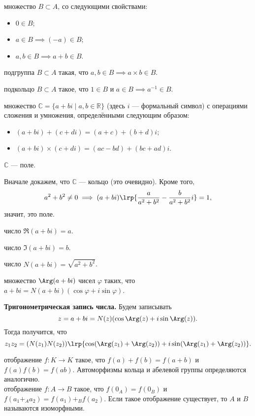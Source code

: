 \documentclass[12pt,a4paper]{article}
\begin{document}
 множество $B\subset A$, со следующими свойствами:

\begin{itemize}
	\item $0\in B$;
	\item $a\in B\implies (-a)\in B$;
	\item $a,b\in B\implies a+b\in B$.
\end{itemize}

 подгруппа $B\subset A$ такая, что $a,b\in B\implies a\times b\in B$.

 подкольцо $B\subset A$ такое, что $1\in B$ и $a\in B\implies a^{-1}\in B$.

 множество $\mathbb C=\{a+bi\mid a,b\in \mathbb R\}$ (здесь $i$ --- формальный символ) с операциями сложения и умножения, определёнными следующим образом:

\begin{itemize}
	\item $(a+bi)+(c+di)=(a+c)+(b+d)i$;
	\item $(a+bi)\times (c+di)=(ac-bd)+(bc+ad)i$.
\end{itemize}

\theorem $\mathbb C$ --- поле.

\proof Вначале докажем, что $\mathbb C$ --- кольцо (это очевидно). Кроме того, \[
	a^2+b^2\neq 0\implies (a+bi)\lrp{\frac{a}{a^2+b^2}-\frac{b}{a^2+b^2}i}=1
,\] значит, это поле.\QEDA
\newpage

 число $\Re(a+bi)=a$.

 число $\Im(a+bi)=b$.

 число $N(a+bi)=\sqrt{a^2+b^2}$.

 множество $\Arg(a+bi)$ чисел $\varphi$ таких, что $a+bi=N(a+bi)(\cos\varphi+i\sin\varphi)$.

\textbf{Тригонометрическая запись числа.} Будем записывать \[
	z=a+bi=N(z)(\cos \Arg(z)+i\sin \Arg(z))
.\]
Тогда получится, что \[
	z_1z_2=(N(z_1)N(z_2))\lrp{\cos (\Arg(z_1)+\Arg(z_2))+i\sin(\Arg(z_1)+\Arg(z_2))}
.\]

 отображение $f:K\to K$ такое, что $f(a)+f(b)=f(a+b)$ и $f(a)f(b)=f(ab)$. Автоморфизмы кольца и абелевой группы определяются аналогично.\\

 отображение $f:A\to B$ такое, что $f(0_A)=f(0_B)$ и $f(a_1+_A a_2)=f(a_1)+_B f(a_2)$. Если такое отображение существует, то $A$ и $B$ называются изоморфными.\\
\end{document}
